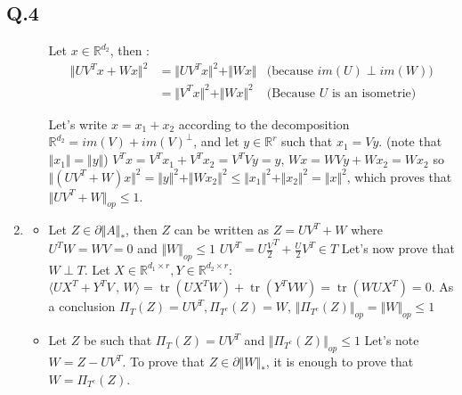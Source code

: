 \documentclass[12pt]{article}\usepackage[]{graphicx}\usepackage[]{color}
\newcommand{\Q}[1]{\subsection*{Q.#1}}
\newenvironment{question}[1]
{\Q{#1}}{}
\newcommand{\norm}[1]{\Vert #1 \Vert}
\newcommand{\nucnorm}[1]{\Vert #1 \Vert_*}
\newcommand{\opnorm}[1]{\Vert #1 \Vert_{op}}
\newcommand{\inner}[2]{\langle #1 \, , \, #2 \rangle}
\DeclareMathOperator{\tr}{tr}
\begin{document}
\begin{question}{4}
\begin{enumerate}
\begin{enumerate}
      Let $x \in \mathbb R^{d_2}$, then :
      \begin{align*}
        \norm{UV^Tx + Wx}^2 &= \norm{UV^Tx}^2 + \norm{Wx} &\text{(because $im(U) \perp im(W)$)}
        \\ &= \norm{V^Tx}^2 + \norm{Wx}^2 &\text{(Because $U$ is an isometrie)}
      \end{align*}

      Let's write $x = x_1 + x_2$ according to the decomposition $\mathbb R^{d_2} = im(V) + im(V)^{\perp}$, and let $y \in \mathbb R^r$ such that $x_1 = Vy$. (note that $\norm{x_1} = \norm{y}$)
      $V^Tx = V^T x_1 + V^T x_2 = V^TVy = y$, 
      $Wx = WV y + Wx_2 = Wx_2$ 
      so $\norm{(UV^T + W)x}^2 = \norm{y}^2 + \norm{Wx_2}^2 \le \norm{x_1}^2 + \norm{x_2}^2 = \norm{x}^2$, which proves that $\opnorm{UV^T + W} \le 1$.
      
    \end{enumerate}
  \item
    \begin{itemize}
    \item Let $Z \in \partial \nucnorm{A}$, then $Z$ can be written as $Z = UV^T + W$ where $U^TW = WV = 0$ and $\opnorm{W} \le 1$
      $UV^T = U\frac V2^T + \frac U2V^T \in T$
      Let's now prove that $W \perp T$. Let $X \in \mathbb R^{d_1 \times r}, Y \in \mathbb R^{d_2 \times r}$:
      $\inner{UX^T + Y^TV}{W} = \tr(UX^TW) + \tr(Y^TVW) = \tr(WUX^T) = 0$.
      As a conclusion $\Pi_T(Z) = UV^T, \Pi_{T^c}(Z) = W$, $\opnorm{\Pi_{T^c}(Z)} = \opnorm{W} \le 1$
    \item Let $Z$ be such that $\Pi_T(Z) = UV^T$ and $\opnorm{\Pi_{T^c}(Z)} \le 1$
      Let's note $W = Z - UV^T$.
      To prove that $Z \in \partial \nucnorm{W}$,
      it is enough to prove that $W = \Pi_{T^c}(Z)$.
    \end{itemize}
\end{enumerate}

\end{question}
\end{document}
